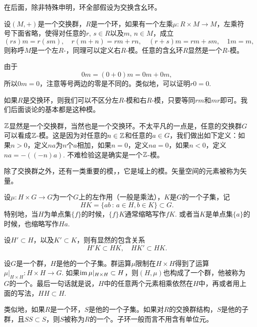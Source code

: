 在后面，除非特殊申明，环全部假设为交换含幺环。

\begin{para}[模]
设$(M,+)$是一个交换群，$R$是一个环，如果有一个左乘$\mu:R\times M\to M$，左乘符号下面省略，使得对任意的$r$, $s\in R$以及$m$, $n\in M$，成立
\[
	(rs)m=r(sm),\quad r(m+n)=rm+rn,\quad (r+s)m=rm+sm,\quad 1m=m,
\]
则称呼$M$是一个左$R$-，同理可以定义右$R$-模。任意的含幺环$R$显然是一个$R$-模。
\end{para}

由于
\[
	0m=(0+0)m=0m+0m,
\]
所以$0m=0$，注意等号两边的零是不同的。类似地，可以证明$r0=0$. 

如果$R$是交换环，则我们可以不区分左$R$-模和右$R$-模，只要等同$rm$和$mr$即可。我们后面谈论的基本都是这种模。

\begin{para}[作为模的交换群]
	$\mathbb{Z}$显然是一个交换群，当然也是一个交换环。不太平凡的一点是，任意的交换群$G$可以看成$\mathbb{Z}$-模。这是因为对任意的$n\in \mathbb{Z}$和任意的$a\in G$，我们做出如下定义：如果$n>0$，定义$na$为$n$个$a$相加，如果$n=0$，定义$na=0$，如果$n<0$，定义$na=-((-n)a)$. 不难检验这是确实是一个$\mathbb{Z}$-模。
\end{para}

除了交换群之外，还有一类重要的模，，它是域上的模。矢量空间的元素被称为矢量。

\begin{para}
设$\mu:H\times G\to G$为一个$G$上的左作用（一般是乘法），$K$是$G$的一个子集，记
\[
	HK=\{ab\,:\,a\in H,b\in K\}\subset G.
\]
特别地，当$H$为单点集$\{f\}$的时候，$\{f\}K$通常缩略写作$fK$. 或者当$K$是单点集$\{a\}$的时候，也缩略写作$Ha$.
\end{para}

设$H'\subset H$，以及$K'\subset K$，则有显然的包含关系
\[
	H'K\subset HK,\quad HK'\subset HK.
\]


\para[子代数结构] 设$G$是一个群，$H$是他的一个子集。群运算$\mu$限制在$H\times H$得到了运算$\mu|_{H\times H}:H\times H\to G$. 如果$\operatorname{im}\mu|_{H\times H}\subset H$，则$(H,\mu)$也构成了一个群，他被称为$G$的一个。最后一句话就是说，$H$中的任意两个元素相乘依然在$H$中，再或者用上面的写法，$HH\subset H$.

类似地，如果$R$是一个环，$S$是他的一个子集。如果对$R$的交换群结构，$S$是他的子群，且$SS\subset S$，则$S$被称为$R$的一个。子环一般而言不用含有单位元。

